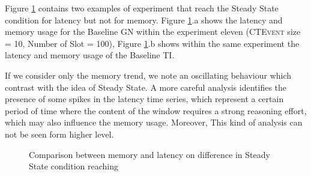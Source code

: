 Figure \ref{fig:level3-not-steady-naive-graph-en11} contains two examples of experiment that reach the Steady State condition for latency but not for memory. Figure \ref{fig:level3-not-steady-naive-graph-en11}.a shows the latency and memory usage for the Baseline GN within the experiment eleven (\textsc{CTEvent} size = 10, Number of Slot = 100), Figure \ref{fig:level3-not-steady-naive-graph-en11}.b shows within the same experiment the latency and memory usage of the Baseline TI. 

If we consider only the memory trend, we note an oscillating behaviour which contrast with the idea of Steady State. A more careful analysis identifies the presence of some spikes in the latency time series, which represent a certain period of time where the content of the window requires a strong reasoning effort, which may also influence the memory usage. Moreover, This kind of analysis can not be seen form higher level. 

\begin{figure}[tbh]
  \centering
  \caption{Comparison between memory and latency on difference in Steady State condition reaching} 
  \label{fig:level3-not-steady-naive-graph-en11}
\end{figure}

